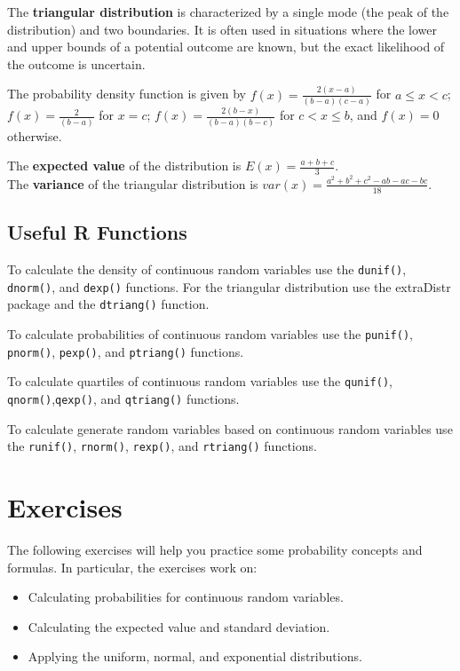 \documentclass[
  letterpaper,
  DIV=11,
  numbers=noendperiod]{scrreprt}
\begin{document}
The \textbf{triangular distribution} is characterized by a single mode
(the peak of the distribution) and two boundaries. It is often used in
situations where the lower and upper bounds of a potential outcome are
known, but the exact likelihood of the outcome is uncertain.

The probability density function is given by
\(f(x)=\frac {2(x-a)}{(b-a)(c-a)}\) for \(a \leq x < c\);
\(f(x)=\frac {2}{(b-a)}\) for \(x=c\);
\(f(x)=\frac {2(b-x)}{(b-a)(b-c)}\) for \(c < x \leq b\), and \(f(x)=0\)
otherwise.

The \textbf{expected value} of the distribution is
\(E(x)= \frac {a+b+c}{3}\).\\
The \textbf{variance} of the triangular distribution is
\(var(x) = \frac {a^2+b^2+c^2-ab-ac-bc}{18}\).

\hypertarget{useful-r-functions-9}{%
\subsection*{Useful R Functions}\label{useful-r-functions-9}}

To calculate the density of continuous random variables use the
\texttt{dunif()}, \texttt{dnorm()}, and \texttt{dexp()} functions. For
the triangular distribution use the extraDistr package and the
\texttt{dtriang()} function.

To calculate probabilities of continuous random variables use the
\texttt{punif()}, \texttt{pnorm()}, \texttt{pexp()}, and
\texttt{ptriang()} functions.

To calculate quartiles of continuous random variables use the
\texttt{qunif()}, \texttt{qnorm()},\texttt{qexp()}, and
\texttt{qtriang()} functions.

To calculate generate random variables based on continuous random
variables use the \texttt{runif()}, \texttt{rnorm()}, \texttt{rexp()},
and \texttt{rtriang()} functions.

\hypertarget{exercises-9}{%
\section{Exercises}\label{exercises-9}}

The following exercises will help you practice some probability concepts
and formulas. In particular, the exercises work on:

\begin{itemize}
\item
  Calculating probabilities for continuous random variables.
\item
  Calculating the expected value and standard deviation.
\item
  Applying the uniform, normal, and exponential distributions.
\end{itemize}
\end{document}
